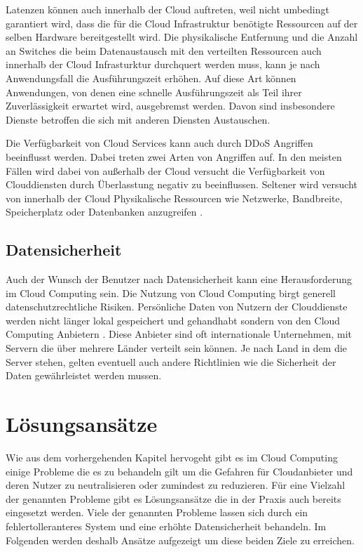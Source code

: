 Latenzen können auch innerhalb der Cloud auftreten, weil nicht umbedingt garantiert wird, dass die für die Cloud Infrastruktur benötigte Ressourcen auf der selben Hardware bereitgestellt wird. 
Die physikalische Entfernung und die Anzahl an Switches die beim Datenaustausch mit den verteilten Ressourcen auch innerhalb der Cloud Infrasturktur durchquert werden muss, kann je nach Anwendungsfall die Ausführungszeit erhöhen.
Auf diese Art können Anwendungen, von denen eine schnelle Ausführungszeit als Teil ihrer Zuverlässigkeit erwartet wird, ausgebremst werden. Davon sind insbesondere Dienste betroffen die sich mit anderen Diensten Austauschen. 

Die Verfügbarkeit von Cloud Services kann auch durch DDoS Angriffen beeinflusst werden. Dabei treten zwei Arten von Angriffen auf. In den meisten Fällen wird dabei von außerhalb der Cloud versucht die Verfügbarkeit von Clouddiensten durch Überlasstung negativ zu beeinflussen. Seltener wird versucht von innerhalb der Cloud Physikalische Ressourcen wie Netzwerke, Bandbreite, Speicherplatz oder Datenbanken anzugreifen \cite{darwish2013}.

\subsection{Datensicherheit}
Auch der Wunsch der Benutzer nach Datensicherheit kann eine Herausforderung im Cloud Computing sein. Die Nutzung von Cloud Computing birgt generell datenschutzrechtliche Risiken. 
Persönliche Daten von Nutzern der Clouddienste werden nicht länger lokal gespeichert und gehandhabt sondern von den Cloud Computing Anbietern \cite{selzer2020}. 
Diese Anbieter sind oft internationale Unternehmen, mit Servern die über mehrere Länder verteilt sein können. Je nach Land in dem die Server stehen, gelten eventuell auch andere Richtlinien wie die Sicherheit der Daten gewährleistet werden mussen.


\section{Lösungsansätze}
Wie aus dem vorhergehenden Kapitel hervogeht gibt es im Cloud Computing einige Probleme die es zu behandeln gilt um die Gefahren für Cloudanbieter und deren Nutzer zu neutralisieren oder zumindest zu reduzieren. 
Für eine Vielzahl der genannten Probleme gibt es Lösungsansätze die in der Praxis auch bereits eingesetzt werden. 
Viele der genannten Probleme lassen sich durch ein fehlertolleranteres System und eine erhöhte Datensicherheit behandeln. Im Folgenden werden deshalb Ansätze aufgezeigt um diese beiden Ziele zu erreichen.

